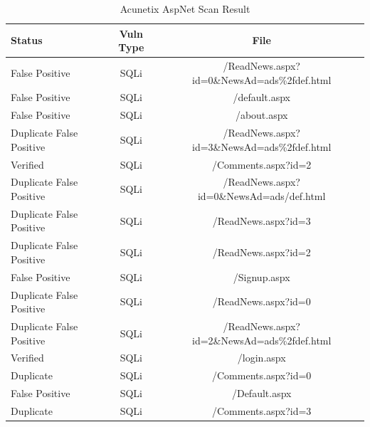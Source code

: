 \documentclass[12pt,a4paper]{article}
\begin{document}
\begin{center}
    \begin{table}
        \caption{Acunetix AspNet Scan Result}
        \begin{center}
            \begin{tabular}{ | l | c | c | }
                \hline
                Status & Vuln Type & File \\ \hline
                False Positive & SQLi & /ReadNews.aspx?id=0\&NewsAd=ads\%2fdef.html \\ \hline
                False Positive & SQLi & /default.aspx \\ \hline
                False Positive & SQLi & /about.aspx \\ \hline
                Duplicate False Positive & SQLi & /ReadNews.aspx?id=3\&NewsAd=ads\%2fdef.html \\ \hline
                Verified & SQLi & /Comments.aspx?id=2 \\ \hline
                Duplicate False Positive & SQLi & /ReadNews.aspx?id=0\&NewsAd=ads/def.html \\ \hline
                Duplicate False Positive & SQLi & /ReadNews.aspx?id=3 \\ \hline
                Duplicate False Positive & SQLi & /ReadNews.aspx?id=2 \\ \hline
                False Positive & SQLi & /Signup.aspx \\ \hline
                Duplicate False Positive & SQLi & /ReadNews.aspx?id=0 \\ \hline
                Duplicate False Positive & SQLi & /ReadNews.aspx?id=2\&NewsAd=ads\%2fdef.html \\ \hline
                Verified & SQLi & /login.aspx \\ \hline
                Duplicate & SQLi & /Comments.aspx?id=0 \\ \hline
                False Positive & SQLi & /Default.aspx \\ \hline
                Duplicate & SQLi & /Comments.aspx?id=3 \\
                \hline
            \end{tabular}
        \end{center}
        \label{tab:acunetix}
    \end{table}
\end{center}
\end{document}

